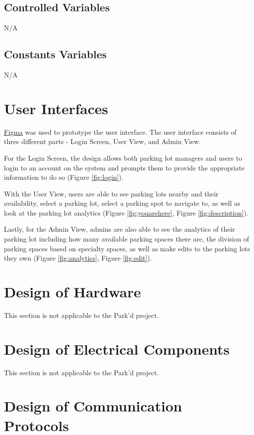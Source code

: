 \documentclass[12pt, titlepage]{article}
\begin{document}
\subsection{Controlled Variables}
N/A

\subsection{Constants Variables}
N/A

\section{User Interfaces} 

\href{https://www.figma.com/file/LglAu6OBHHntlaihSaGUhv/DESIGN-DRAFT?node-id=0%3A1&t=lYDORXYJa3TJiJ7X-1}{Figma}
was used to prototype the user interface. The user interface consists of three
different parts - Login Screen, User View, and Admin View.

For the Login Screen, the design allows both parking lot managers and users to
login to an account on the system and prompts them to provide the appropriate
information to do so (Figure \ref{fig:login}).

With the User View, users are able to see parking lots nearby and their
availability, select a parking lot, select a parking spot to navigate to, as
well as look at the parking lot analytics (Figure \ref{fig:youarehere}, Figure
\ref{fig:description}).

Lastly, for the Admin View, admins are also able to see the analytics of their
parking lot including how many available parking spaces there are, the division
of parking spaces based on specialty spaces, as well as make edits to the
parking lots they own (Figure \ref{fig:analytics}, Figure \ref{fig:edit}).

\section{Design of Hardware}

This section is not applicable to the Park'd project.

\section{Design of Electrical Components}

This section is not applicable to the Park'd project.

\section{Design of Communication Protocols}
\end{document}
